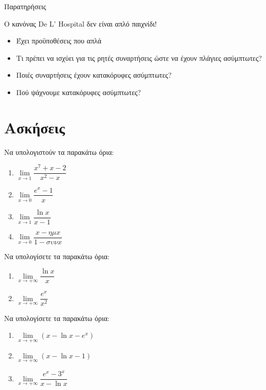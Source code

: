 \documentclass{presentation}
\begin{document}
\begin{frame}{Παρατηρήσεις}

    Ο κανόνας De L' Hospital δεν είναι απλό παιχνίδι!

    \begin{itemize}
        \item<1-> Έχει προϋποθέσεις που απλά
        \item<2-> Τι πρέπει να ισχύει για τις ρητές συναρτήσεις ώστε να έχουν πλάγιες ασύμπτωτες?
        \item<3-> Ποιές συναρτήσεις έχουν κατακόρυφες ασύμπτωτες?
        \item<4-> Πού ψάχνουμε κατακόρυφες ασύμπτωτες?
    \end{itemize}

\end{frame}

\section{Ασκήσεις}
\begin{askisi}
    Να υπολογιστούν τα παρακάτω όρια:
    \begin{enumerate}
        \item<1-> $\lim\limits_{x \to 1}{ \dfrac{x^7+x-2}{x^2-x} }$
        \item<2-> $\lim\limits_{x \to 0}{ \dfrac{e^x-1}{x} }$
        \item<3-> $\lim\limits_{x \to 1}{ \dfrac{\ln x}{x-1} }$
        \item<4-> $\lim\limits_{x \to 0}{ \dfrac{x-ημx}{1-συνx} }$
    \end{enumerate}

\end{askisi}

\begin{askisi}
    Να υπολογίσετε τα παρακάτω όρια:
    \begin{enumerate}
        \item<1-> $\lim\limits_{x \to +\infty}{ \dfrac{\ln x}{x} }$
        \item<2-> $\lim\limits_{x \to +\infty}{ \dfrac{e^x}{x^2} }$
    \end{enumerate}

\end{askisi}

\begin{askisi}
    Να υπολογίσετε τα παρακάτω όρια:
    \begin{enumerate}
        \item<1-> $\lim\limits_{x \to +\infty}{ (x-\ln x-e^x) }$
        \item<2-> $\lim\limits_{x \to +\infty}{ (x-\ln x-1) }$
        \item<3-> $\lim\limits_{x \to +\infty}{ \dfrac{e^x-3^x}{x-\ln x} }$
    \end{enumerate}

\end{askisi}
\end{document}
